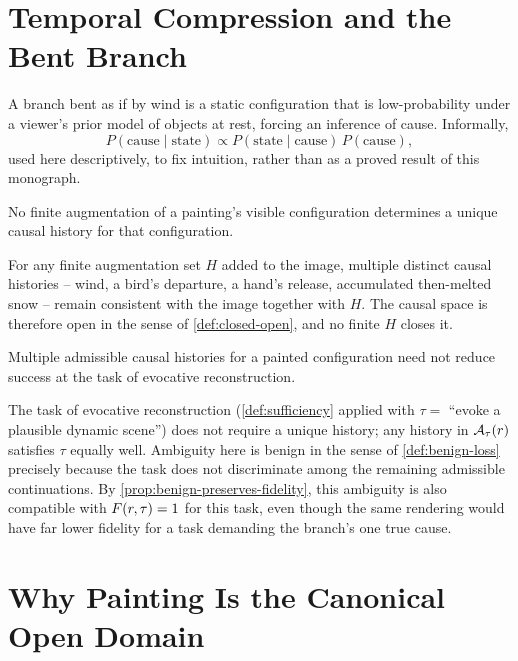 \section{Temporal Compression and the Bent Branch}

A branch bent as if by wind is a static configuration that is
low-probability under a viewer's prior model of objects at rest, forcing
an inference of cause. Informally,
\[
P(\text{cause} \mid \text{state}) \propto P(\text{state} \mid
\text{cause})\, P(\text{cause}),
\]
used here descriptively, to fix intuition, rather than as a proved result
of this monograph.

\begin{proposition}
\label{prop:open-causal-space}
No finite augmentation of a painting's visible configuration determines
a unique causal history for that configuration.
\end{proposition}

\begin{proofsketch}
For any finite augmentation set $H$ added to the image, multiple distinct
causal histories -- wind, a bird's departure, a hand's release,
accumulated then-melted snow -- remain consistent with the image together
with $H$. The causal space is therefore open in the sense of
\cref{def:closed-open}, and no finite $H$ closes it.
\end{proofsketch}

\begin{proposition}
\label{prop:benign-ambiguity}
Multiple admissible causal histories for a painted configuration need not
reduce success at the task of evocative reconstruction.
\end{proposition}

\begin{proofsketch}
The task of evocative reconstruction (\cref{def:sufficiency} applied with
$\tau = $ ``evoke a plausible dynamic scene'') does not require a unique
history; any history in $\mathcal{A}_{\tau}(r)$ satisfies $\tau$ equally well.
Ambiguity here is benign in the sense of \cref{def:benign-loss} precisely
because the task does not discriminate among the remaining admissible
continuations. By \cref{prop:benign-preserves-fidelity}, this ambiguity
is also compatible with $F(r,\tau) = 1$ for this task, even
though the same rendering would have far lower fidelity for a task
demanding the branch's one true cause.
\end{proofsketch}

\section{Why Painting Is the Canonical Open Domain}

